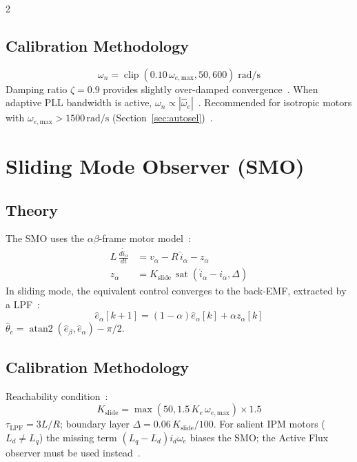 \documentclass[10pt,twoside,a4paper]{article}
\newcommand{\est}[1]{\hat{#1}}
\newcommand{\ddt}[1]{\frac{d#1}{dt}}
\newcommand{\clip}{\operatorname{clip}}
\newcommand{\sat}{\operatorname{sat}}
\begin{document}
\begin{multicols}{2}
\subsection{Calibration Methodology}

\begin{equation}
  \omega_n=\clip\!\left(0.10\,\omega_{e,\text{max}},50,600\right)\;\text{rad/s}
\end{equation}
Damping ratio $\zeta=0.9$ provides slightly over-damped convergence~\cite{lorenz1994}.
When adaptive PLL bandwidth is active, $\omega_n\propto|\est\omega_e|$~\cite{lorenz1994}.
Recommended for isotropic motors with $\omega_{e,\text{max}}>1500\,\text{rad/s}$
(Section~\ref{sec:autosel})~\cite{bose2002,schroedl1996}.

\newpage
\section{Sliding Mode Observer (SMO)}\label{sec:smo}

\subsection{Theory}

The SMO uses the $\alpha\beta$-frame motor model~\cite{lascu2000,utkin2009}:
\begin{align}
  L\,\ddt{\est{i}_\alpha} &= v_\alpha - R\,\est{i}_\alpha - z_\alpha\\
  z_\alpha &= K_\text{slide}\,\sat(\est{i}_\alpha - i_\alpha,\Delta)
\end{align}
In sliding mode, the equivalent control converges to the back-EMF, extracted by
a LPF~\cite{lascu2000,levant1993}:
\begin{equation}
  \est{e}_\alpha[k+1]=(1-\alpha)\est{e}_\alpha[k]+\alpha z_\alpha[k]
\end{equation}
$\est\theta_e=\operatorname{atan2}(\est{e}_\beta,\est{e}_\alpha)-\pi/2$.

\subsection{Calibration Methodology}

Reachability condition~\cite{lascu2000,utkin2009}:
\begin{equation}
  K_\text{slide}=\max\!\left(50,1.5\,K_e\,\omega_{e,\text{max}}\right)\times1.5
\end{equation}
$\tau_\text{LPF}=3L/R$; boundary layer $\Delta=0.06\,K_\text{slide}/100$.
For salient IPM motors ($L_d\neq L_q$) the missing term $(L_q-L_d)i_d\omega_e$
biases the SMO; the Active Flux observer must be used instead~\cite{xu1998,boldea2008}.


\end{multicols}
\end{document}
